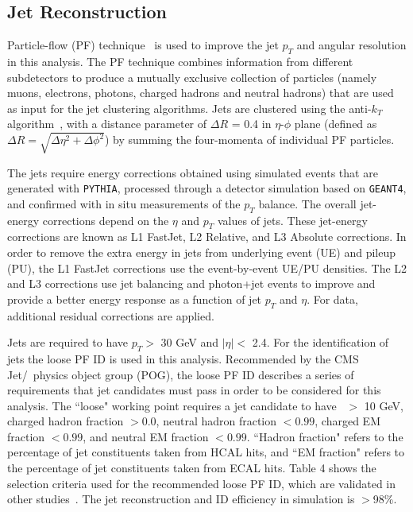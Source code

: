 \subsection{Jet Reconstruction}

Particle-flow (PF) technique~\cite{CMS-PAS-PFT-09-001,CMS-PAS-PFT-10-002} is used to improve the jet $p_T$ and angular resolution in this analysis.
The PF technique combines information from different subdetectors to produce a mutually exclusive collection of particles (namely muons, electrons, photons, 
charged hadrons and neutral hadrons) that are used as input for the jet clustering algorithms.
Jets are clustered using the anti-$k_{T}$ algorithm~\cite{anti-kT}, with a distance parameter of $\Delta R$ = 0.4 in $\eta$-$\phi$ plane (defined as $\Delta R = 
\sqrt{\Delta \eta^2 + \Delta \phi^2}$) by summing the four-momenta of individual PF particles.

The jets require energy corrections obtained using simulated events that are generated with \texttt{PYTHIA}, processed through a detector simulation based on 
\texttt{GEANT4}, and confirmed with in situ measurements of the $p_T$ balance.
The overall jet-energy corrections depend on the $\eta$ and $p_T$ values of jets.
These jet-energy corrections are known as L1 FastJet, L2 Relative, and L3 Absolute corrections. In order to remove the extra energy in jets from underlying event 
(UE) and pileup (PU), the L1 FastJet corrections use the event-by-event UE/PU densities.
The L2 and L3 corrections use jet balancing and photon+jet events to improve and provide a better energy response as a function of jet $p_T$ and $\eta$.
For data, additional residual corrections are applied.

Jets are required to have $p_T >$ 30 GeV and $|\eta| <$ 2.4.
For the identification of jets the loose PF ID is used in this analysis. Recommended by the CMS Jet/\MET ~physics object group (POG), the loose PF ID describes a series of requirements that jet candidates must pass in order to be considered for this analysis. The ``loose" working point requires a jet candidate to have \pt ~$>$ 10 GeV, charged hadron fraction $> 0.0$, neutral hadron fraction $< 0.99$, charged EM fraction $< 0.99$, and neutral EM fraction $< 0.99$. ``Hadron fraction" refers to the percentage of jet constituents taken from HCAL hits, and ``EM fraction" refers to the percentage of jet constituents taken from ECAL hits.
Table 4 shows the selection criteria used for the recommended loose PF ID, which are validated in other studies~\cite{CMS-PAS-FSQ-12-035}.
The jet reconstruction and ID efficiency in simulation is $>$98\%.


